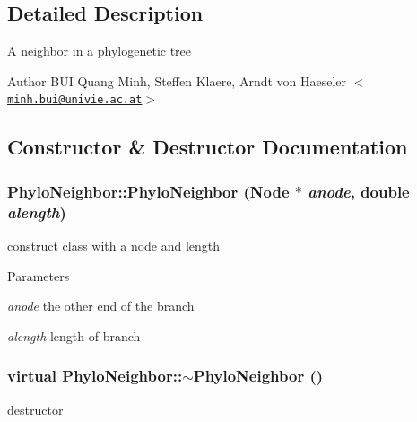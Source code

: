 \subsection{Detailed Description}
A neighbor in a phylogenetic tree

\begin{DoxyAuthor}{Author}
BUI Quang Minh, Steffen Klaere, Arndt von Haeseler $<$\href{mailto:minh.bui@univie.ac.at}{\tt minh.bui@univie.ac.at}$>$ 
\end{DoxyAuthor}


\subsection{Constructor \& Destructor Documentation}
\hypertarget{classPhyloNeighbor_a7bed9a973f5f185142219be91e1ca654}{
\subsubsection[{PhyloNeighbor}]{\setlength{\rightskip}{0pt plus 5cm}PhyloNeighbor::PhyloNeighbor ({\bf Node} $\ast$ {\em anode}, \/  double {\em alength})}}
\label{classPhyloNeighbor_a7bed9a973f5f185142219be91e1ca654}
construct class with a node and length 
\begin{DoxyParams}{Parameters}
\item[{\em anode}]the other end of the branch \item[{\em alength}]length of branch \end{DoxyParams}
\hypertarget{classPhyloNeighbor_a60a5db92883b1af1679adab253bf1ce1}{
\subsubsection[{$\sim$PhyloNeighbor}]{\setlength{\rightskip}{0pt plus 5cm}virtual PhyloNeighbor::$\sim$PhyloNeighbor ()}}
\label{classPhyloNeighbor_a60a5db92883b1af1679adab253bf1ce1}
destructor 

